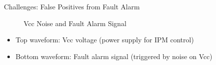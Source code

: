 \begin{frame}{Challenges: False Positives from Fault Alarm}

	\begin{figure}
		\centering
		\caption{Vcc Noise and Fault Alarm Signal}
	\end{figure}

	\begin{itemize}
		\item Top waveform: Vcc voltage (power supply for IPM control)
		\item Bottom waveform: Fault alarm signal (triggered by noise on Vcc)
	\end{itemize}

\end{frame}
